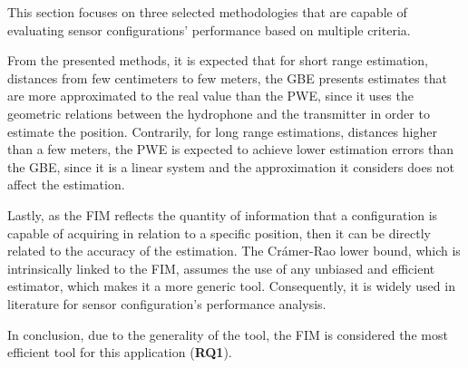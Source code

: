 This section focuses on three selected methodologies that are capable of evaluating sensor configurations' performance based on multiple criteria.

From the presented methods, it is expected that for short range estimation, distances from few centimeters to few meters,  the GBE presents estimates that are more approximated to the real value than the PWE, since it uses the geometric relations between the hydrophone and the transmitter in order to estimate the position. Contrarily, for long range estimations, distances higher than a few meters, the PWE is expected to achieve lower estimation errors than the GBE, since it is a linear system and the approximation it considers does not affect the estimation.

Lastly, as the FIM reflects the quantity of information that a configuration is capable of acquiring in relation to a specific position, then it can be directly related to the accuracy of the estimation. The Crámer-Rao lower bound, which is intrinsically linked to the FIM, assumes the use of any unbiased and efficient estimator, which makes it a more generic tool. Consequently, it is widely used in literature for sensor configuration's performance analysis. 

In conclusion, due to the generality of the tool, the FIM is considered the most efficient tool for this application (\textbf{RQ1}). 
